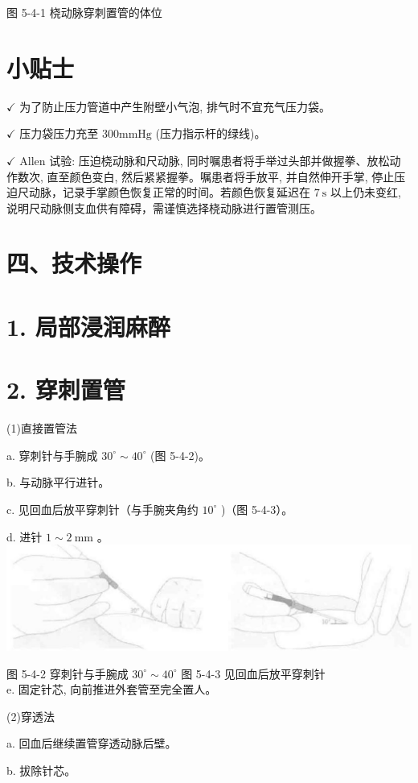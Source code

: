 \documentclass[10pt]{article}
\begin{document}
图 5-4-1 桡动脉穿刺置管的体位

\section*{小贴士}
$\checkmark$ 为了防止压力管道中产生附壁小气泡, 排气时不宜充气压力袋。

$\checkmark$ 压力袋压力充至 $300 \mathrm{mmHg}$ (压力指示杆的绿线)。

$\checkmark$ Allen 试验: 压迫桡动脉和尺动脉, 同时嘱患者将手举过头部并做握拳、放松动作数次, 直至颜色变白, 然后紧紧握拳。嘱患者将手放平, 并自然伸开手掌, 停止压迫尺动脉，记录手掌颜色恢复正常的时间。若颜色恢复延迟在 $7 \mathrm{~s}$ 以上仍未变红, 说明尺动脉侧支血供有障碍，需谨慎选择桡动脉进行置管测压。

\section*{四、技术操作}
\section*{1. 局部浸润麻醉}
\section*{2. 穿刺置管}
(1)直接置管法

a. 穿刺针与手腕成 $30^{\circ} \sim 40^{\circ}$ (图 5-4-2)。

b. 与动脉平行进针。

c. 见回血后放平穿刺针（与手腕夹角约 $10^{\circ}$ )（图 5-4-3）。

d. 进针 $1 \sim 2 \mathrm{~mm}$ 。\\
\includegraphics[max width=\textwidth, center]{2024_07_05_645bb794a4d4f32ee0c8g-298}

图 5-4-2 穿刺针与手腕成 $30^{\circ} \sim 40^{\circ}$ 图 5-4-3 见回血后放平穿刺针\\
e. 固定针芯, 向前推进外套管至完全置人。

(2)穿透法

a. 回血后继续置管穿透动脉后壁。

b. 拔除针芯。
\end{document}
